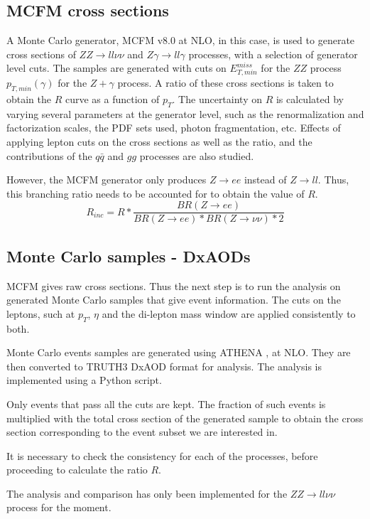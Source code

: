 \documentclass[11pt,a4paper,final]{report}
\newcommand{\ZZ}{$ZZ\rightarrow ll\nu\nu$ }
\newcommand{\Zgam}{$Z\gamma\rightarrow ll\gamma$ }
\begin{document}
\subsection*{MCFM cross sections}
A Monte Carlo generator, MCFM v8.0 \cite{MCFM} at NLO, in this case, is used to generate cross sections of \ZZ and \Zgam processes, with a selection of generator level cuts. The samples are generated with cuts on $E_{T,min}^{miss}$ for the $ZZ$ process $p_{T,min}(\gamma)$ for the $Z+\gamma$ process. A ratio of these cross sections is taken to obtain the $R$ curve as a function of $p_T$. The uncertainty on $R$ is calculated by varying several parameters at the generator level, such as the renormalization and factorization scales, the PDF sets used, photon fragmentation, etc. Effects of applying lepton cuts on the cross sections as well as the ratio, and the contributions of the $q \bar{q}$ and $gg$ processes are also studied.

However, the MCFM generator only produces $Z\rightarrow ee$ instead of $Z\rightarrow ll$. Thus, this branching ratio needs to be accounted for to obtain the value of $R$.
\begin{equation}\label{eq:R_inc}
	R_{inc} = R * \frac{BR(Z\rightarrow ee)}{BR(Z \rightarrow ee)*BR(Z\rightarrow \nu\nu)*2}
\end{equation}

\subsection*{Monte Carlo samples - DxAODs}
MCFM gives raw cross sections. Thus the next step is to run the analysis on generated Monte Carlo samples that give event information. The cuts on the leptons, such at $p_T$, $\eta$ and the di-lepton mass window are applied consistently to both.

Monte Carlo events samples are generated using ATHENA \cite{ATHENA}, at NLO. They are then converted to TRUTH3 DxAOD format for analysis. The analysis is implemented using a Python script.

Only events that pass all the cuts are kept. The fraction of such events is multiplied with the total cross section of the generated sample to obtain the cross section corresponding to the event subset we are interested in.

It is necessary to check the consistency for each of the processes, before proceeding to calculate the ratio $R$.

The analysis and comparison has only been implemented for the $ZZ \rightarrow ll\nu\nu$ process for the moment.
\end{document}
